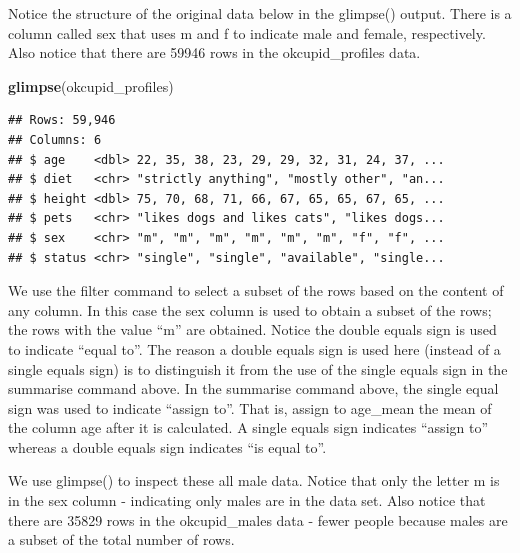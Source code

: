 \documentclass[
]{krantz}
\makeatletter
\newenvironment{Shaded}{\begin{snugshade}}{\end{snugshade}}
\newcommand{\KeywordTok}[1]{\textcolor[rgb]{0.27,0.27,0.27}{\textbf{#1}}}
\newcommand{\NormalTok}[1]{#1}
\newcommand{\OperatorTok}[1]{\textcolor[rgb]{0.43,0.43,0.43}{\textbf{#1}}}
\newcommand{\StringTok}[1]{\textcolor[rgb]{0.5,0.5,0.5}{#1}}
\newenvironment{kframe}{%
\medskip{}
\setlength{\fboxsep}{.8em}
 \def\at@end@of@kframe{}%
 \ifinner\ifhmode%
  \def\at@end@of@kframe{\end{minipage}}%
  \begin{minipage}{\columnwidth}%
 \fi\fi%
 \def\FrameCommand##1{\hskip\@totalleftmargin \hskip-\fboxsep
 \colorbox{shadecolor}{##1}\hskip-\fboxsep
     \hskip-\linewidth \hskip-\@totalleftmargin \hskip\columnwidth}%
 \MakeFramed {\advance\hsize-\width
   \@totalleftmargin\z@ \linewidth\hsize
   \@setminipage}}%
 {\par\unskip\endMakeFramed%
 \at@end@of@kframe}
\renewenvironment{Shaded}{\begin{kframe}}{\end{kframe}}
\makeatother
\begin{document}
Notice the structure of the original data below in the glimpse() output. There is a column called sex that uses m and f to indicate male and female, respectively. Also notice that there are 59946 rows in the okcupid\_profiles data.

\begin{Shaded}
\begin{Highlighting}[]
\KeywordTok{glimpse}\NormalTok{(okcupid_profiles)}
\end{Highlighting}
\end{Shaded}

\begin{verbatim}
## Rows: 59,946
## Columns: 6
## $ age    <dbl> 22, 35, 38, 23, 29, 29, 32, 31, 24, 37, ...
## $ diet   <chr> "strictly anything", "mostly other", "an...
## $ height <dbl> 75, 70, 68, 71, 66, 67, 65, 65, 67, 65, ...
## $ pets   <chr> "likes dogs and likes cats", "likes dogs...
## $ sex    <chr> "m", "m", "m", "m", "m", "m", "f", "f", ...
## $ status <chr> "single", "single", "available", "single...
\end{verbatim}

We use the filter command to select a subset of the rows based on the content of any column. In this case the sex column is used to obtain a subset of the rows; the rows with the value ``m'' are obtained. Notice the double equals sign is used to indicate ``equal to''. The reason a double equals sign is used here (instead of a single equals sign) is to distinguish it from the use of the single equals sign in the summarise command above. In the summarise command above, the single equal sign was used to indicate ``assign to''. That is, assign to age\_mean the mean of the column age after it is calculated. A single equals sign indicates ``assign to'' whereas a double equals sign indicates ``is equal to''.

\begin{Shaded}
\end{Shaded}

We use glimpse() to inspect these all male data. Notice that only the letter m is in the sex column - indicating only males are in the data set. Also notice that there are 35829 rows in the okcupid\_males data - fewer people because males are a subset of the total number of rows.
\end{document}
